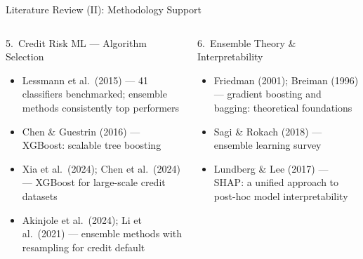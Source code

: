\documentclass[9pt,aspectratio=169]{beamer}
\begin{document}
\begin{frame}{Literature Review (II): Methodology Support}
\vspace{-4pt}
\begin{columns}[T]
    \begin{block}{5.\ Credit Risk ML --- Algorithm Selection}
      \footnotesize
      \begin{itemize}\setlength\itemsep{2pt}
        \item Lessmann et al.\ (2015) --- 41 classifiers benchmarked;
              ensemble methods consistently top performers
        \item Chen \& Guestrin (2016) --- XGBoost: scalable tree boosting
        \item Xia et al.\ (2024); Chen et al.\ (2024) --- XGBoost for
              large-scale credit datasets
        \item Akinjole et al.\ (2024); Li et al.\ (2021) --- ensemble
              methods with resampling for credit default
      \end{itemize}
    \end{block}
    \vspace{5pt}
    \begin{block}{6.\ Ensemble Theory \& Interpretability}
      \footnotesize
      \begin{itemize}\setlength\itemsep{2pt}
        \item Friedman (2001); Breiman (1996) --- gradient boosting and
              bagging: theoretical foundations
        \item Sagi \& Rokach (2018) --- ensemble learning survey
        \item Lundberg \& Lee (2017) --- SHAP: a unified approach to
              post-hoc model interpretability
      \end{itemize}
    \end{block}


\end{columns}
\end{frame}
\end{document}
